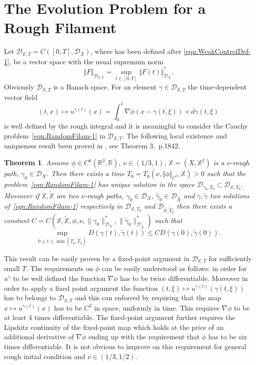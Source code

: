 \documentclass[11pt,a4paper,reqno]{amsart}%
\theoremstyle{plain}
\newtheorem{theorem}{Theorem}[section]
\theoremstyle{remark}
\theoremstyle{plain}
\numberwithin{equation}{section}
\def\Rnu{{\mathbb R}}
\def\supl{\sup\limits}
\def\supl{\mathop{\sup}\limits}
\begin{document}
\section{The Evolution Problem for a Rough Filament}
Let $\mathcal{D}_{\mathbb{X},T}=C([0,T],\mathcal{D}_X)$, where has been defined after 
\eqref{eqn:WeakControlDef-1},  be a
vector space with the usual supremum norm
\begin{equation}
\Vert F\Vert_{\mathcal{D}_{\mathbb{X},T}}=\supl_{t\in[0,T]}\Vert F(t)\Vert_{\mathcal{D}_X}^*\label{eqn:NormDef}.
\end{equation}
Obviously $\mathcal{D}_{\mathbb{X},T}$ is a Banach space. For an element $\gamma \in \mathcal{D}_{\mathbb{X},T}$ the time-dependent vector field
$$
(t,x)\mapsto u^{\gamma(t)}(x) =\int_0^1 \nabla \phi(x-\gamma(t,\xi)) \times d\gamma(t,\xi)
$$
is well defined by the rough integral and it is meaningful to consider the  Cauchy problem~\eqref{eqn:RandomFilam-1} in $\mathcal{D}_{\mathbb{X},T}$.
The following local existence and uniqueness result been proved in \cite{[Bess+Gub_2005]}, see Theorem
$3$,~p.1842.
\begin{theorem}\label{thm:LocalExistUniq}
Assume $\phi\in C^6(\Rnu^3,\Rnu)$, $\nu\in ({1}/{3},1)$,
$\mathbb{X}=(X,\mathbb{X}^2)$ is a $\nu$-rough path, $\gamma_0\in
\mathcal{D}_X$. Then there exists a time
$T_0=T_0(\nu,\Vert \phi\Vert_{C^5},\mathbb{X})>0$ such that the problem~\eqref{eqn:RandomFilam-1} has unique
solution in the space  $\mathcal{D}_{\gamma_0,T_0}\subset\mathcal{D}_{\mathbb{X},T_0}$. Moveover if $\mathbb{X}, \tilde{\mathbb{X}}$ are two $\nu$-rough paths, $\gamma_0\in \mathcal{D}_X$, $\tilde \gamma_0\in
\mathcal{D}_{\tilde{X}}$ and $\gamma,\tilde \gamma$  two solutions of~\eqref{eqn:RandomFilam-1} respectively in $\mathcal{D}_{\mathbb{X},T_0}$ and $\mathcal{D}_{\tilde{\mathbb{X}},\tilde T_0}$ then there exists a constant $C=C(\mathbb{X},\tilde{\mathbb{X}},\phi,\nu,\|\gamma_0\|_{\mathcal{D}_X}^*,\|\tilde \gamma_0\|_{\mathcal{D}_{\tilde{X}}}^*)$ such that
$$
\sup_{0\le t\le \min(T_0,\tilde T_0)} D(\gamma(t),\tilde \gamma(t)) \le C D(\gamma(0),\tilde \gamma(0)) . 
$$
\end{theorem}
This result can be easily proven by a fixed-point argument in  $\mathcal{D}_{\mathbb{X},T}$  for sufficiently small $T$. The requirements on $\phi$ can be easily understood as follows: in order for $u^\gamma$ to be well defined the function $\nabla \phi$ has to be twice differentiable. Moreover in order to apply a fixed point argument the function $(t,\xi) \mapsto u^{\gamma(t)}(\gamma(t,\xi))$ has to belongs to  $\mathcal{D}_{\mathbb{X},T}$ and this can enforced by requiring that the map $x \mapsto u^{\gamma(t)}(x)$ has to be $C^2$ in space, uniformly in time. This requires $\nabla \phi$ to be at least 4 times differentiable. The fixed-point argument further requires the Lipshitz continuity of the fixed-point map which holds at the price of an additional derivative of $\nabla \phi$ ending up with the requirement that $\phi$ has to be six times differentiable. It is not obvious to improve on this requirement for general rough initial condition and $\nu\in(1/3,1/2)$. 
\end{document}
